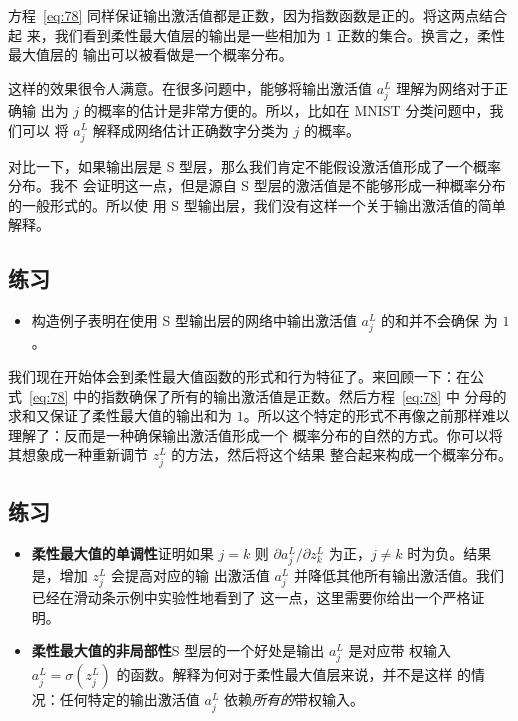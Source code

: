 方程~\eqref{eq:78} 同样保证输出激活值都是正数，因为指数函数是正的。将这两点结合起
来，我们看到柔性最大值层的输出是一些相加为 $1$ 正数的集合。换言之，柔性最大值层的
输出可以被看做是一个概率分布。

这样的效果很令人满意。在很多问题中，能够将输出激活值 $a^L_j$ 理解为网络对于正确输
出为 $j$ 的概率的估计是非常方便的。所以，比如在 MNIST 分类问题中，我们可以
将 $a^L_j$ 解释成网络估计正确数字分类为 $j$ 的概率。

对比一下，如果输出层是 S 型层，那么我们肯定不能假设激活值形成了一个概率分布。我不
会证明这一点，但是源自 S 型层的激活值是不能够形成一种概率分布的一般形式的。所以使
用 S 型输出层，我们没有这样一个关于输出激活值的简单解释。

\subsection*{练习}

\begin{itemize}
\item 构造例子表明在使用 S 型输出层的网络中输出激活值 $a^L_j$ 的和并不会确保
  为 $1$。
\end{itemize}

我们现在开始体会到柔性最大值函数的形式和行为特征了。来回顾一下：在公
式~\eqref{eq:78} 中的指数确保了所有的输出激活值是正数。然后方程~\eqref{eq:78} 中
分母的求和又保证了柔性最大值的输出和为
$1$。所以这个特定的形式不再像之前那样难以理解了：反而是一种确保输出激活值形成一个
概率分布的自然的方式。你可以将其想象成一种重新调节 $z^L_j$ 的方法，然后将这个结果
整合起来构成一个概率分布。

\subsection*{练习}

\begin{itemize}
\item \textbf{柔性最大值的单调性}\quad 证明如果 $j=k$ 则 $\partial a^L_j
  / \partial z^L_k$ 为正，$j \neq k$ 时为负。结果是，增加 $z^L_j$ 会提高对应的输
  出激活值 $a^L_j$ 并降低其他所有输出激活值。我们已经在滑动条示例中实验性地看到了
  这一点，这里需要你给出一个严格证明。
\item \textbf{柔性最大值的非局部性}\quad S 型层的一个好处是输出 $a^L_j$ 是对应带
  权输入 $a^L_j = \sigma(z^L_j)$ 的函数。解释为何对于柔性最大值层来说，并不是这样
  的情况：任何特定的输出激活值 $a^L_j$ 依赖\emph{所有的}带权输入。
\end{itemize}


